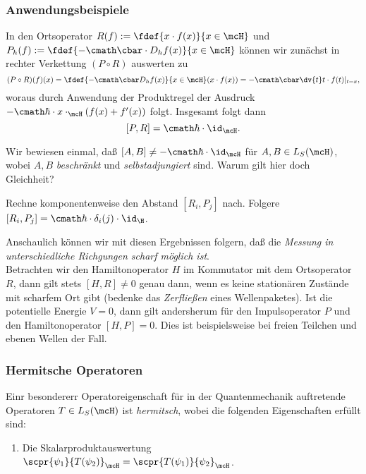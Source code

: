 \documentclass{subfiles}
\begin{document}
        \subsubsection*{Anwendungsbeispiele}
            In den Ortsoperator $R(f):=\fdef{x\cdot f(x)}{x\in\mcH}$ und $P_h(f):=\fdef{-\cmath\cbar\cdot D_hf(x)}{x\in\mcH}$ können wir zunächst in rechter Verkettung $(P\circ R)$ auswerten zu 
            \[(P\circ R)(f)(x) = \fdef{-\cmath\cbar D_hf(x)}{x\in\mcH}(x\cdot f(x)) = -\cmath\cbar \dv{t}t\cdot f(t)|_{t = x},\]
            woraus durch Anwendung der Produktregel der Ausdruck $-\cmath\hbar\cdot x\cdot_\mcH (f(x)+f'(x))$ folgt. Insgesamt folgt dann
            \[[P,R] = \cmath\hbar\cdot \id_\mcH.\]

            \begin{Aufgabe}
                \nr{} Wir bewiesen einmal, daß $[A,B]\neq-\cmath\hbar\cdot\id_\mcH$ für $A,B\in L_S(\mcH)$, wobei $A,B$ \emph{beschränkt} und \emph{selbstadjungiert} sind. Warum gilt hier doch Gleichheit?

                \nr{} Rechne komponentenweise den Abstand $[R_i,P_j]$ nach. Folgere $[R_i,P_j] = \cmath\hbar\cdot\delta_i(j)\cdot\id_\H$. 
            \end{Aufgabe}
            Anschaulich können wir mit diesen Ergebnissen folgern, daß die \textit{Messung in unterschiedliche Richgungen scharf möglich ist}. \\

            Betrachten wir den Hamiltonoperator $H$ im Kommutator mit dem Ortsoperator $R$, dann gilt stets $[H,R]\neq 0$ genau dann, wenn es keine stationären Zustände mit scharfem Ort gibt (bedenke das \emph{Zerfließen} eines Wellenpaketes). Ist die potentielle Energie $V=0$, dann gilt andersherum für den Impulsoperator $P$ und den Hamiltonoperator $[H,P] = 0$. Dies ist beispielsweise bei freien Teilchen und ebenen Wellen der Fall. 

        \subsubsection*{Hermitsche Operatoren}
            Einr besondererr Operatoreigenschaft für in der Quantenmechanik auftretende Operatoren $T\in L_S(\mcH)$ ist \emph{hermitsch}, wobei die folgenden Eigenschaften erfüllt sind:
            \begin{enumerate}[label=(\roman*)]
                \item Die Skalarproduktauswertung $\scpr{\psi_1}{T(\psi_2)}_{\mcH} = \scpr{T(\psi_1)}{\psi_2}_{\mcH}$.
            \end{enumerate}
\end{document}
